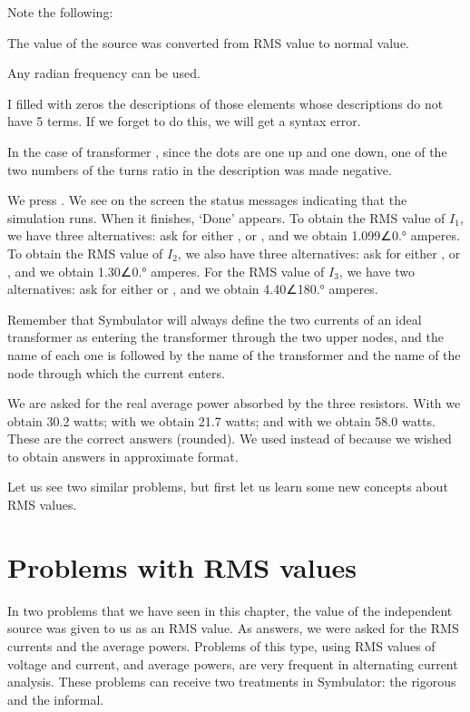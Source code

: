 Note the following:

The value of the source was converted from RMS value to normal
value.

Any radian frequency can be used.

I filled with zeros the descriptions of those elements whose
descriptions do not have 5 terms. If we forget to do this, we will
get a syntax error.

In the case of transformer , since the dots are one up and
one down, one of the two numbers of the turns ratio in the
description was made negative.

We press . We see on the screen the status messages
indicating that the simulation runs. When it finishes, `Done'
appears. To obtain the RMS value of $I_1$, we have three
alternatives: ask for either ,
 or , and we obtain
1.099∠0.° amperes. To obtain the RMS value of $I_2$, we also have
three alternatives: ask for either ,
 or , and we obtain
1.30∠0.° amperes. For the RMS value of $I_3$, we have two
alternatives: ask for either  or
, and we obtain 4.40∠180.° amperes.

Remember that Symbulator will always define the two currents of an
ideal transformer as entering the transformer through the two upper
nodes, and the name of each one is  followed by the name of
the transformer and the name of the node through which the current
enters.

We are asked for the real average power absorbed by the three
resistors. With  we obtain 30.2 watts; with
 we obtain 21.7 watts; and with
 we obtain 58.0 watts. These are the correct
answers (rounded). We used  instead of  because
we wished to obtain answers in approximate format.

Let us see two similar problems, but first let us learn some new
concepts about RMS values.

\section{Problems with RMS values}

In two problems that we have seen in this chapter, the value of the
independent source was given to us as an RMS value. As answers, we
were asked for the RMS currents and the average powers. Problems of
this type, using RMS values of voltage and current, and average
powers, are very frequent in alternating current analysis. These
problems can receive two treatments in Symbulator: the rigorous and
the informal.

